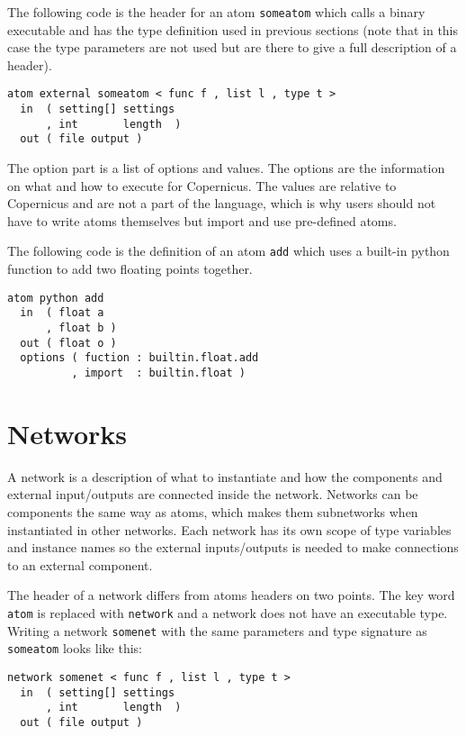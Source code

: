 The following code is the header for an atom \verb#someatom# which
calls a binary executable and has the type definition used in previous
sections (note that in this case the type parameters are not used but
are there to give a full description of a header).

\begin{verbatim}
atom external someatom < func f , list l , type t >
  in  ( setting[] settings
      , int       length  )
  out ( file output )
\end{verbatim}

The option part is a list of options and values. The options are the
information on what and how to execute for Copernicus. The values are
relative to Copernicus and are not a part of the language, which is
why users should not have to write atoms themselves but import and use
pre-defined atoms.

The following code is the definition of an atom \verb#add# which uses
a built-in python function to add two floating points together.

\begin{verbatim}
atom python add
  in  ( float a
      , float b )
  out ( float o )
  options ( fuction : builtin.float.add
          , import  : builtin.float )
\end{verbatim}

\section{Networks}\label{sec:net}
A network is a description of what to instantiate and how the
components and external input/outputs are connected inside the
network. Networks can be components the same way as atoms, which makes
them subnetworks when instantiated in other networks. Each network has
its own scope of type variables and instance names so the external
inputs/outputs is needed to make connections to an external component.

The header of a network differs from atoms headers on two points. The
key word \verb#atom# is replaced with \verb#network# and a network
does not have an executable type. Writing a network \verb#somenet#
with the same parameters and type signature as \verb#someatom# looks
like this:

\begin{verbatim}
network somenet < func f , list l , type t >
  in  ( setting[] settings
      , int       length  )
  out ( file output )
\end{verbatim}

